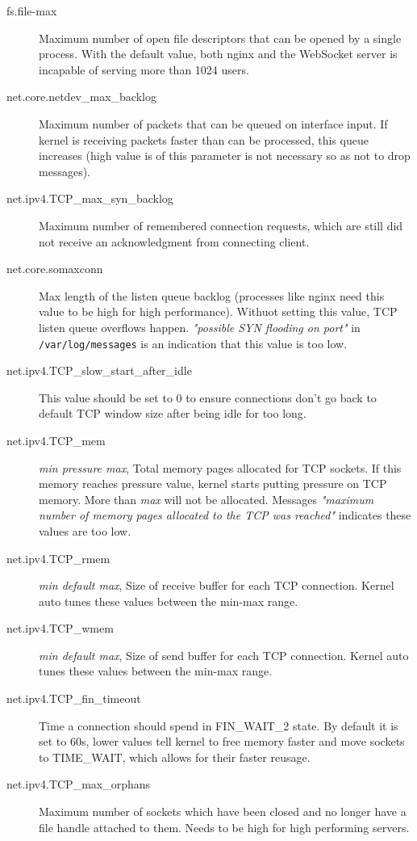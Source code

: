\documentclass{uvamscse}
\begin{document}
\begin{description}
  \item[fs.file-max] Maximum number of open file descriptors that can be opened by a single process. With the default value, both nginx and the WebSocket server is incapable of serving more than 1024 users.
  \item[net.core.netdev\_max\_backlog] Maximum number of packets that can be queued on interface input. If kernel is receiving packets faster than can be processed, this queue increases (high value is of this parameter is not necessary so as not to drop messages).
  \item[net.ipv4.TCP\_max\_syn\_backlog] Maximum number of remembered connection requests, which are still did not receive an acknowledgment from connecting client.
  \item[net.core.somaxconn] Max length of the listen queue backlog (processes like nginx need this value to be high for high performance). Withuot setting this value, TCP listen queue overflows happen. \textit{"possible SYN flooding on port"} in \texttt{/var/log/messages} is an indication that this value is too low.
  \item[net.ipv4.TCP\_slow\_start\_after\_idle] This value should be set to 0 to ensure connections don't go back to default TCP window size after being idle for too long.
  \item[net.ipv4.TCP\_mem] \textit{min pressure max}, Total memory pages allocated for TCP sockets. If this memory reaches pressure value, kernel starts putting pressure on TCP memory. More than \textit{max} will not be allocated. Messages \textit{"maximum number of memory pages allocated to the TCP was reached"} indicates these values are too low.
  \item[net.ipv4.TCP\_rmem] \textit{min default max}, Size of receive buffer for each TCP connection. Kernel auto tunes these values between the min-max range.
  \item[net.ipv4.TCP\_wmem] \textit{min default max}, Size of send buffer for each TCP connection. Kernel auto tunes these values between the min-max range.
  \item[net.ipv4.TCP\_fin\_timeout] Time a connection should spend in FIN\_WAIT\_2 state. By default it is set to 60s, lower values tell kernel to free memory faster and move sockets to TIME\_WAIT, which allows for their faster reusage.
  \item[net.ipv4.TCP\_max\_orphans] Maximum number of sockets which have been closed and no longer have a file handle attached to them. Needs to be high for high performing servers.

\end{description}
\end{document}
